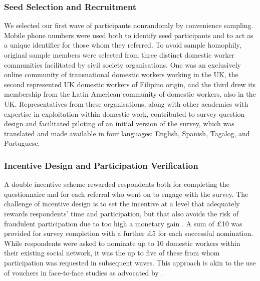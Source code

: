\documentclass[
  12pt,
  letterpaper,
  DIV=11,
  numbers=noendperiod]{scrartcl}
\theoremstyle{plain}
\theoremstyle{definition}
\begin{document}
\subsubsection{Seed Selection and
Recruitment}\label{seed-selection-and-recruitment}

We selected our first wave of participants nonrandomly by convenience
sampling. Mobile phone numbers were used both to identify seed
participants and to act as a unique identifier for those whom they
referred. To avoid sample homophily, original sample members were
selected from three distinct domestic worker communities facilitated by
civil society organisations. One was an exclusively online community of
transnational domestic workers working in the UK, the second represented
UK domestic workers of Filipino origin, and the third drew its
membership from the Latin American community of domestic workers, also
in the UK. Representatives from these organisations, along with other
academics with expertise in exploitation within domestic work,
contributed to survey question design and facilitated piloting of an
initial version of the survey, which was translated and made available
in four languages: English, Spanish, Tagalog, and Portuguese.

\subsubsection{Incentive Design and Participation
Verification}\label{incentive-design-and-participation-verification}

A double incentive scheme rewarded respondents both for completing the
questionnaire and for each referral who went on to engage with the
survey. The challenge of incentive design is to set the incentive at a
level that adequately rewards respondents' time and participation, but
that also avoids the risk of fraudulent participation due to too high a
monetary gain \autocite{jordan_overcoming_2020}. A sum of £10 was
provided for survey completion with a further £5 for each successful
nomination. While respondents were asked to nominate up to 10 domestic
workers within their existing social network, it was the up to five of
these from whom participation was requested in subsequent waves. This
approach is akin to the use of vouchers in face-to-face studies as
advocated by \textcite{thompson_new_2020}.
\end{document}
